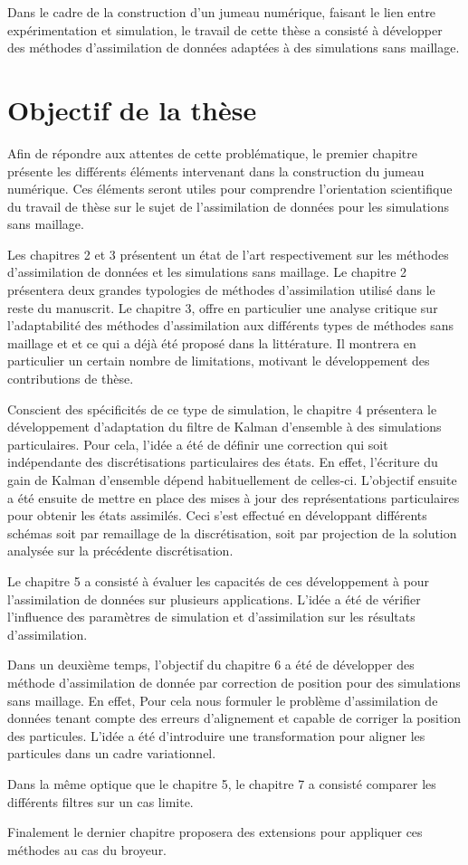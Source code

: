 Dans le cadre de la construction d'un jumeau numérique, faisant le lien entre expérimentation et simulation, le travail de cette thèse a consisté à développer des méthodes d'assimilation de données adaptées à des simulations sans maillage.

\section{Objectif de la thèse}

Afin de répondre aux attentes de cette problématique, le premier chapitre présente les différents éléments intervenant dans la construction du jumeau numérique. Ces éléments seront utiles pour comprendre l'orientation scientifique du travail de thèse sur le sujet de l'assimilation de données pour les simulations sans maillage.

Les chapitres 2 et 3 présentent un état de l'art respectivement sur les méthodes d'assimilation de données et les simulations sans maillage. Le chapitre 2 présentera deux grandes typologies de méthodes d'assimilation utilisé dans le reste du manuscrit. Le chapitre 3, offre en particulier une analyse critique sur l'adaptabilité des méthodes d'assimilation aux différents types de méthodes sans maillage et et ce qui a déjà été proposé dans la littérature. Il montrera en particulier un certain nombre de limitations, motivant le développement des contributions de thèse.

Conscient des spécificités de ce type de simulation, le chapitre 4 présentera le développement d'adaptation du filtre de Kalman d'ensemble à des simulations particulaires. Pour cela, l'idée a été de définir une correction qui soit indépendante des discrétisations particulaires des états. En effet, l'écriture du gain de Kalman d'ensemble dépend habituellement de celles-ci. L’objectif ensuite a été ensuite de mettre en place des mises à jour des représentations particulaires pour obtenir les états assimilés. Ceci s’est effectué en développant différents schémas soit par remaillage de la discrétisation, soit par projection de la solution analysée sur la précédente discrétisation.

Le chapitre 5 a consisté à évaluer les capacités de ces développement à pour l'assimilation de données sur plusieurs applications. L'idée a été de vérifier l'influence des paramètres de simulation et d'assimilation sur les résultats d'assimilation.

Dans un deuxième temps, l'objectif du chapitre 6 a été de développer des méthode d'assimilation de donnée par correction de position pour des simulations sans maillage. En effet, Pour cela nous formuler le problème d'assimilation de données tenant compte des erreurs d'alignement et capable de corriger la position des particules. L'idée a été d'introduire une transformation pour aligner les particules dans un cadre variationnel.

Dans la même optique que le chapitre 5, le chapitre 7 a consisté comparer les différents filtres sur un cas limite.

Finalement le dernier chapitre proposera des extensions pour appliquer ces méthodes au cas du broyeur.